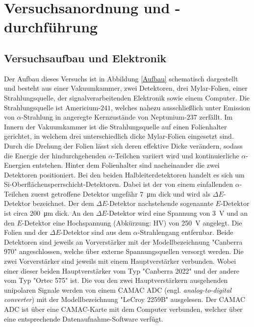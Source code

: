 \section{Versuchsanordnung und -durchführung}

\subsection{Versuchsaufbau und Elektronik} \label{AufbauElektronik}

Der Aufbau dieses Versuchs ist in Abbildung \ref{Aufbau} schematisch dargestellt und besteht aus einer Vakuumkammer, zwei Detektoren, drei Mylar-Folien, einer Strahlungsquelle, der signalverarbeitenden Elektronik sowie einem Computer.
\noindent Die Strahlungsquelle ist Americium-$241$, welches nahezu ausschließlich unter Emission von $\alpha$-Strahlung in angeregte Kernzustände von Neptunium-$237$ zerfällt.
Im Innern der Vakuumkammer ist die Strahlungsquelle auf einen Folienhalter gerichtet, in welchem drei unterschiedlich dicke Mylar-Folien eingesetzt sind.
Durch die Drehung der Folien lässt sich deren effektive Dicke verändern, sodass die Energie der hindurchgehenden $\alpha$-Teilchen variiert wird und kontinuierliche $\alpha$-Energien entstehen.
Hinter dem Folienhalter sind nacheinander die zwei Detektoren positioniert.
Bei den beiden Halbleiterdetektoren handelt es sich um Si-Oberflächensperrschicht-Detektoren.
Dabei ist der von einem einfallenden $\alpha$-Teilchen zuerst getroffene Detektor ungefähr \SI{7}{\micro\meter} dick und wird als $\Delta E$-Detektor bezeichnet.
Der dem $\Delta E$-Detektor nachstehende sogenannte $E$-Detektor ist circa \SI{200}{\micro\meter} dick.
An den $\Delta E$-Detektor wird eine Spannung von \SI{3}{\volt} und an den $E$-Detektor eine Hochspannung (Abkürzung: HV) von \SI{250}{\volt} angelegt.
Die Folien und der $\Delta E$-Detektor sind aus dem $\alpha$-Strahlengang entfernbar.
Beide Detektoren sind jeweils an Vorverstärker mit der Modellbezeichnung "Canberra 970" angeschlossen, welche über externe Spannungsquellen versorgt werden.
Die zwei Vorverstärker sind jeweils mit einem Hauptverstärker verbunden.
Wobei einer dieser beiden Hauptverstärker vom Typ "Canberra 2022" und der andere vom Typ "Ortec 575" ist.
Die von den zwei Hauptverstärkern ausgehenden unipolaren Signale werden von einem CAMAC ADC (engl. \emph{analog-to-digital converter}) mit der Modellbezeichnung "LeCroy 2259B" ausgelesen.
Der CAMAC ADC ist über eine CAMAC-Karte mit dem Computer verbunden, welcher über eine entsprechende Datenaufnahme-Software verfügt.
